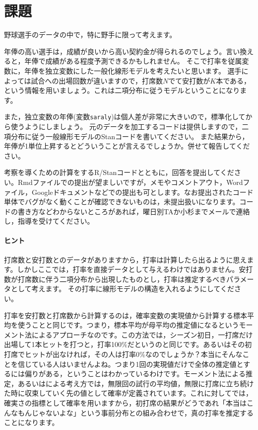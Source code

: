 \documentclass{ltjsbook}
\begin{document}
\section{課題} 
野球選手のデータの中で，特に野手に限って考えます。

年俸の高い選手は，成績が良いから高い契約金が得られるのでしょう。言い換えると，年俸で成績がある程度予測できるかもしれません。
そこで打率を従属変数に，年俸を独立変数にした一般化線形モデルを考えたいと思います。
選手によっては試合への出場回数が違いますので，打席数$N$でて安打数が$K$本である，という情報を用いましょう。これは二項分布に従うモデルということになります。

また，独立変数の年俸(変数\verb|saraly|)は個人差が非常に大きいので，標準化してから使うようにしましょう。
元のデータを加工するコードは提供しますので，二項分布に従う一般線形モデルのStanコードを書いてください。
また結果から，年俸が1単位上昇するとどういうことが言えるでしょうか。併せて報告してください。

考察を導くための計算をするR/Stanコードとともに，回答を提出してください。Rmdファイルでの提出が望ましいですが，メモやコメントアウト，Wordファイル，Googleドキュメントなどでの提出も可とします。なお提出されたコード単体でバグがなく動くことが確認できないものは，未提出扱いになります。コードの書き方などわからないところがあれば，曜日別TAか小杉までメールで連絡し，指導を受けてください。

\paragraph{ヒント}
打席数と安打数とのデータがありますから，打率は計算したら出るように思えます。しかしここでは，打率を直接データとして与えるわけではありません。安打数が打席数に伴う二項分布から出現したものとし，打率は推定するべきパラメータとして考えます。
その打率に線形モデルの構造を入れるようにしてください。

打率を安打数と打席数から計算するのは，確率変数の実現値から計算する標本平均を使うことと同じです。つまり，標本平均が母平均の推定値になるというモーメント法によるアプローチなのです。この方法では，シーズン初日，一打席だけ出場して1本ヒットを打つと，打率100\%だというのと同じです。あるいはその初打席でヒットが出なければ，その人は打率0\%なのでしょうか？本当にそんなことを信じている人はいませんよね。つまり1回の実現値だけで全体の推定値とするには偏りがある，ということはわかっているわけです。モーメント法による推定，あるいはによる考え方では，無限回の試行の平均値，無限に打席に立ち続けた時に収束していく先の値として確率が定義されています。これに対してでは，確実さの指標として確率を用いますから，初打席の結果がどうであれ「本当はこんなもんじゃないよな」という事前分布との組み合わせで，真の打率を推定することになります。
\end{document}
